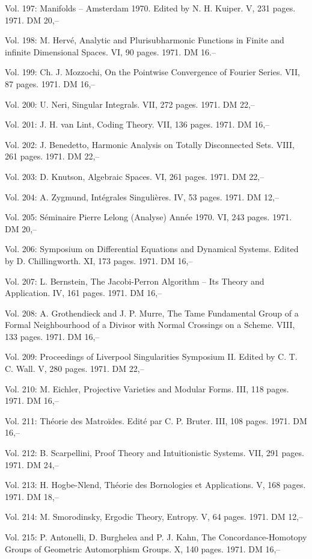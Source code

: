 Vol. 197: Manifolds -- Amsterdam 1970. Edited by N. H. Kuiper. V, 231 pages. 1971. DM 20,--

Vol. 198: M. Hervé, Analytic and Plurisubharmonic Functions in Finite and infinite Dimensional Spaces. VI, 90 pages. 1971. DM 16.--

Vol. 199: Ch. J. Mozzochi, On the Pointwise Convergence of Fourier Series. VII, 87 pages. 1971. DM 16,--

Vol. 200: U. Neri, Singular Integrals. VII, 272 pages. 1971. DM 22,--

Vol. 201: J. H. van Lint, Coding Theory. VII, 136 pages. 1971. DM 16,--

Vol. 202: J. Benedetto, Harmonic Analysis on Totally Disconnected Sets. VIII, 261 pages. 1971. DM 22,--

Vol. 203: D. Knutson, Algebraic Spaces. VI, 261 pages. 1971. DM 22,--

Vol. 204: A. Zygmund, Intégrales Singulières. IV, 53 pages. 1971. DM 12,--

Vol. 205: Séminaire Pierre Lelong (Analyse) Année 1970. VI, 243 pages. 1971. DM 20,--

Vol. 206: Symposium on Differential Equations and Dynamical Systems. Edited by D. Chillingworth. XI, 173 pages. 1971. DM 16,--

Vol. 207: L. Bernstein, The Jacobi-Perron Algorithm -- Its Theory and Application. IV, 161 pages. 1971. DM 16,--

Vol. 208: A. Grothendieck and J. P. Murre, The Tame Fundamental Group of a Formal Neighbourhood of a Divisor with Normal Crossings on a Scheme. VIII, 133 pages. 1971. DM 16,--

Vol. 209: Proceedings of Liverpool Singularities Symposium II. Edited by C. T. C. Wall. V, 280 pages. 1971. DM 22,--

Vol. 210: M. Eichler, Projective Varieties and Modular Forms. III, 118 pages. 1971. DM 16,--

Vol. 211: Théorie des Matroïdes. Edité par C. P. Bruter. III, 108 pages. 1971. DM 16,--

Vol. 212: B. Scarpellini, Proof Theory and Intuitionistic Systems. VII, 291 pages. 1971. DM 24,--

Vol. 213: H. Hogbe-Nlend, Théorie des Bornologies et Applications. V, 168 pages. 1971. DM 18,--

Vol. 214: M. Smorodinsky, Ergodic Theory, Entropy. V, 64 pages. 1971. DM 12,--

Vol. 215: P. Antonelli, D. Burghelea and P. J. Kahn, The Concordance-Homotopy Groups of Geometric Automorphism Groups. X, 140 pages. 1971. DM 16,--

